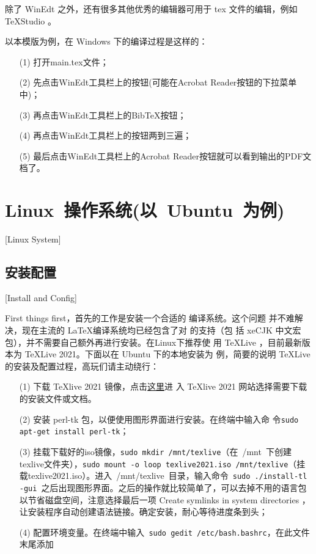 除了 WinEdt 之外，还有很多其他优秀的编辑器可用于 tex 文件的编辑，例如 TeXStudio 。

以本模版为例，在 Windows 下的编译过程是这样的：
\begin{enumerate}
  \item[(1)] 打开main.tex文件；
  \item[(2)] 先点击WinEdt工具栏上的\XeLaTeX{}按钮(可能在Acrobat Reader按钮的下拉菜单中)；
  \item[(3)] 再点击WinEdt工具栏上的Bib\TeX{}按钮；
  \item[(4)] 再点击WinEdt工具栏上的\XeLaTeX{}按钮两到三遍；
  \item[(5)] 最后点击WinEdt工具栏上的Acrobat Reader按钮就可以看到输出的PDF文档了。
\end{enumerate}

\section{Linux~操作系统(以~Ubuntu~为例)}[Linux System]

\subsection{安装配置}[Install and Config]

First things first，首先的工作是安装一个合适的 \XeTeX{}编译系统。这个问题
并不难解决，现在主流的 \LaTeX{}编译系统均已经包含了对 \XeTeX{}的支持（包
括 xeCJK 中文宏包），并不需要自己额外再进行安装。在Linux下推荐使
用 \TeX{}Live ，目前最新版本为 \TeX{}Live 2021。下面以在 Ubuntu 下的本地安装为
例，简要的说明 \TeX{}Live 的安装及配置过程，高玩们请主动绕行：

\begin{enumerate}
  \item[(1)] 下载 \TeX{}live 2021 镜像，点击\href{https://tug.org/texlive/}{这里}进    入 \TeX{}live 2021 网站选择需要下载的安装文件或文档。
  \item[(2)] 安装 perl-tk 包，以便使用图形界面进行安装。在终端中输入命    令\texttt{sudo apt-get install perl-tk}；
  \item[(3)] 挂载下载好的iso镜像，\texttt{sudo mkdir /mnt/texlive}（在~{/mnt}~下创建texlive文件夹），\texttt{sudo mount -o loop texlive2021.iso  /mnt/texlive}（挂载texlive2021.iso）。进入~/mnt/texlive~目录，输入命令~\texttt{sudo ./install-tl -gui}~之后出现图形界面。之后的操作就比较简单了，可以去掉不用的语言包以节省磁盘空间，注意选择最后一项 Create symlinks in system directories ，让安装程序自动创建语法链接。确定安装，耐心等待进度条到头；
  \item[(4)] 配置环境变量。在终端中输入~\texttt{sudo gedit /etc/bash.bashrc}，在此文件末尾添加
\end{enumerate}

